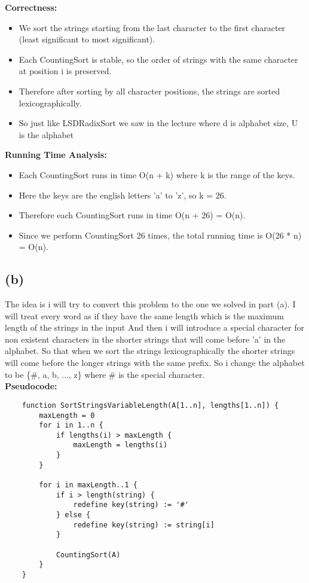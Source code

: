 \documentclass{article}
\begin{document}
\textbf{Correctness:}
\begin{itemize}
    \item We sort the strings starting from the last character to the first character (least significant to most significant).
    \item Each CountingSort is stable, so the order of strings with the same character at position i is preserved.
    \item Therefore after sorting by all character positions, the strings are sorted lexicographically.
    \item So just like LSDRadixSort we saw in the lecture where d is alphabet size, U is the alphabet
\end{itemize}

\textbf{Running Time Analysis:}
\begin{itemize}
    \item Each CountingSort runs in time O(n + k) where k is the range of the keys.
    \item Here the keys are the english letters 'a' to 'z', so k = 26.
    \item Therefore each CountingSort runs in time O(n + 26) = O(n).
    \item Since we perform CountingSort 26 times, the total running time is O(26 * n) = O(n).
\end{itemize}

\subsection*{(b)}
The idea is i will try to convert this problem to the one we solved in part (a). I will treat every word as if they have the same length which is the maximum length of the strings in the input
And then i will introduce a special character for non existent characters in the shorter strings that will come before 'a' in the alphabet.
So that when we sort the strings lexicographically the shorter strings will come before the longer strings with the same prefix. So i change the alphabet to be \{\#, a, b, ..., z\} where \# is the special character. \\

\textbf{Pseudocode:}
\begin{verbatim}
    function SortStringsVariableLength(A[1..n], lengths[1..n]) {
        maxLength = 0
        for i in 1..n {
            if lengths(i) > maxLength {
                maxLength = lengths(i)
            }
        }

        for i in maxLength..1 {
            if i > length(string) {
                redefine key(string) := '#'
            } else {
                redefine key(string) := string[i]
            }

            CountingSort(A)
        }
    }
\end{verbatim}
\end{document}
